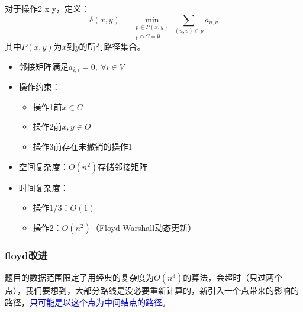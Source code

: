 \documentclass[../mainReport.tex]{subfiles} %
\begin{document}
对于操作2 x y，定义：
$$
\delta(x,y) = \min_{\substack{p \in P(x,y) \\ p \cap C = \emptyset}} \sum_{(u,v)\in p} a_{u,v}
$$
其中$P(x,y)$为$x$到$y$的所有路径集合。

\begin{itemize}
\item 邻接矩阵满足$a_{i,i}=0,\ \forall i\in V$
\item 操作约束：
  \begin{itemize}
  \item 操作1前$x \in C$
  \item 操作2前$x,y \in O$
  \item 操作3前存在未撤销的操作1
  \end{itemize}
\end{itemize}

\begin{itemize}
\item 空间复杂度：$O(n^2)$存储邻接矩阵
\item 时间复杂度：
  \begin{itemize}
  \item 操作1/3：$O(1)$
  \item 操作2：$O(n^2)$（Floyd-Warshall动态更新）
  \end{itemize}
\end{itemize}


\subsubsection{floyd改进}
题目的数据范围限定了用经典的复杂度为$O(n^3)$的算法，会超时（只过两个点），我们要想到，大部分路线是没必要重新计算的，新引入一个点带来的影响的路径，\textcolor{blue}{只可能是以这个点为中间结点的路径}。


\end{document}
